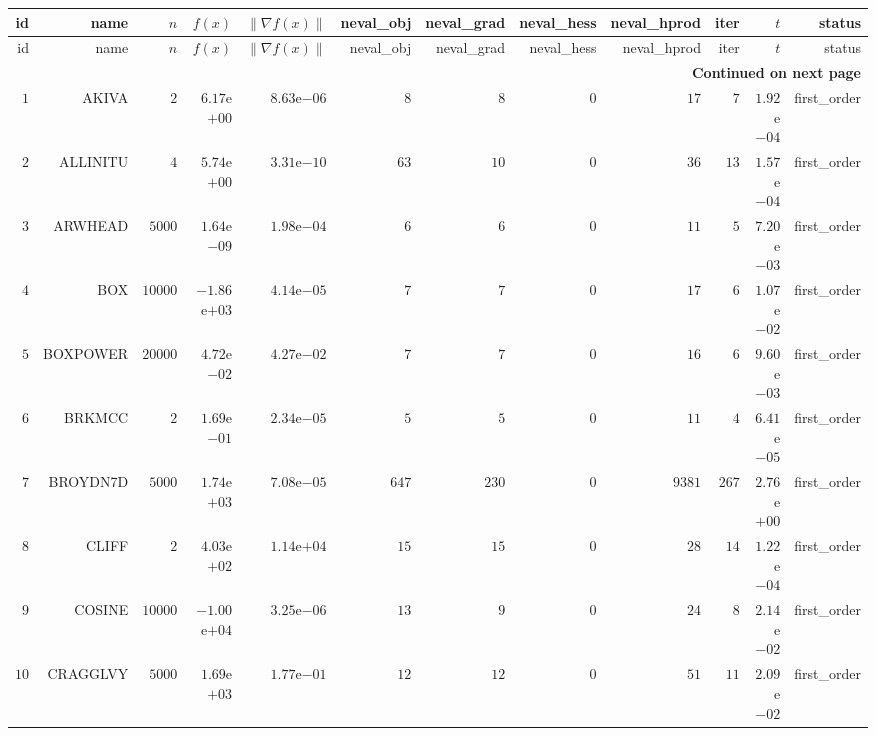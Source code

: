 \begin{longtable}{rrrrrrrrrrrr}
  \hline
  id & name & \(n\) & \(f(x)\) & \(\|\nabla f(x)\|\) & neval\_obj & neval\_grad & neval\_hess & neval\_hprod & iter & \(t\) & status \\\hline
  \endfirsthead
  \hline
  id & name & \(n\) & \(f(x)\) & \(\|\nabla f(x)\|\) & neval\_obj & neval\_grad & neval\_hess & neval\_hprod & iter & \(t\) & status \\\hline
  \endhead
  \hline
  \multicolumn{12}{r}{{\bfseries Continued on next page}}\\
  \hline
  \endfoot
  \endlastfoot
  \(     1\) & AKIVA & \(     2\) & \( 6.17\)e\(+00\) & \( 8.63\)e\(-06\) & \(     8\) & \(     8\) & \(     0\) & \(    17\) & \(     7\) & \( 1.92\)e\(-04\) & first\_order \\
  \(     2\) & ALLINITU & \(     4\) & \( 5.74\)e\(+00\) & \( 3.31\)e\(-10\) & \(    63\) & \(    10\) & \(     0\) & \(    36\) & \(    13\) & \( 1.57\)e\(-04\) & first\_order \\
  \(     3\) & ARWHEAD & \(  5000\) & \( 1.64\)e\(-09\) & \( 1.98\)e\(-04\) & \(     6\) & \(     6\) & \(     0\) & \(    11\) & \(     5\) & \( 7.20\)e\(-03\) & first\_order \\
  \(     4\) & BOX & \( 10000\) & \(-1.86\)e\(+03\) & \( 4.14\)e\(-05\) & \(     7\) & \(     7\) & \(     0\) & \(    17\) & \(     6\) & \( 1.07\)e\(-02\) & first\_order \\
  \(     5\) & BOXPOWER & \( 20000\) & \( 4.72\)e\(-02\) & \( 4.27\)e\(-02\) & \(     7\) & \(     7\) & \(     0\) & \(    16\) & \(     6\) & \( 9.60\)e\(-03\) & first\_order \\
  \(     6\) & BRKMCC & \(     2\) & \( 1.69\)e\(-01\) & \( 2.34\)e\(-05\) & \(     5\) & \(     5\) & \(     0\) & \(    11\) & \(     4\) & \( 6.41\)e\(-05\) & first\_order \\
  \(     7\) & BROYDN7D & \(  5000\) & \( 1.74\)e\(+03\) & \( 7.08\)e\(-05\) & \(   647\) & \(   230\) & \(     0\) & \(  9381\) & \(   267\) & \( 2.76\)e\(+00\) & first\_order \\
  \(     8\) & CLIFF & \(     2\) & \( 4.03\)e\(+02\) & \( 1.14\)e\(+04\) & \(    15\) & \(    15\) & \(     0\) & \(    28\) & \(    14\) & \( 1.22\)e\(-04\) & first\_order \\
  \(     9\) & COSINE & \( 10000\) & \(-1.00\)e\(+04\) & \( 3.25\)e\(-06\) & \(    13\) & \(     9\) & \(     0\) & \(    24\) & \(     8\) & \( 2.14\)e\(-02\) & first\_order \\
  \(    10\) & CRAGGLVY & \(  5000\) & \( 1.69\)e\(+03\) & \( 1.77\)e\(-01\) & \(    12\) & \(    12\) & \(     0\) & \(    51\) & \(    11\) & \( 2.09\)e\(-02\) & first\_order \\

\end{longtable}
